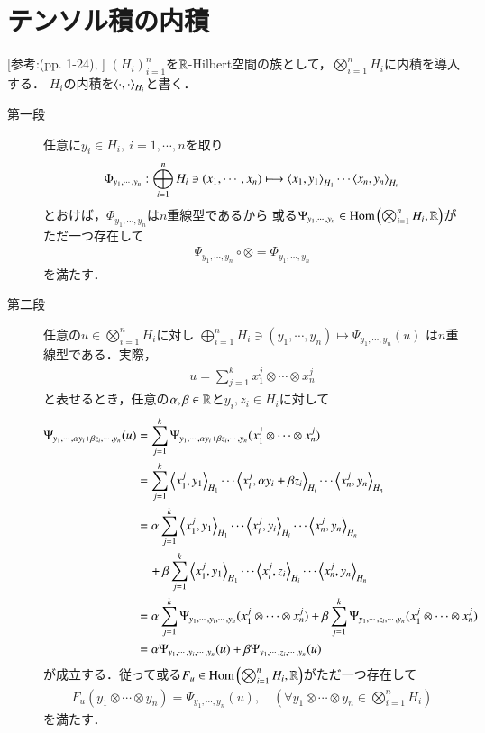 \section{テンソル積の内積}
	[参考:\cite{key8}(pp. 1-24), \cite{key7}] 
	$(H_i)_{i=1}^n$を$\mathbb{R}$-Hilbert空間の族として，$\bigotimes_{i=1}^n H_i$に内積を導入する．
	$H_i$の内積を$\inprod<\cdot,\cdot>_{H_i}$と書く．
	\begin{description}
		\item[第一段] 
			任意に$y_i \in H_i,\ i=1,\cdots,n$を取り
			\begin{align}
				\Phi_{y_1,\cdots,y_n}:
				\bigoplus_{i=1}^n H_i \ni (x_1,\cdots,x_n)
				\longmapsto \inprod<x_1,y_1>_{H_1} \cdots \inprod<x_n,y_n>_{H_n}
			\end{align}
			とおけば，$\Phi_{y_1,\cdots,y_n}$は$n$重線型であるから
			或る$\Psi_{y_1,\cdots,y_n} \in \mathrm{Hom} \left(\bigotimes_{i=1}^n H_i,\mathbb{R}\right)$がただ一つ存在して
			\begin{align}
				\Psi_{y_1,\cdots,y_n} \circ \otimes = \Phi_{y_1,\cdots,y_n}
			\end{align}
			を満たす．
			
		\item[第二段]
			任意の$u \in \bigotimes_{i=1}^n H_i$に対し
			$\bigoplus_{i=1}^n H_i \ni (y_1,\cdots,y_n) \longmapsto \Psi_{y_1,\cdots,y_n}(u)$
			は$n$重線型である．実際，
			\begin{align}
				u = \sum_{j=1}^k x^j_1 \otimes \cdots \otimes x^j_n
			\end{align}
			と表せるとき，任意の$\alpha,\beta \in \mathbb{R}$と$y_i,z_i \in H_i$に対して
			\begin{align}
				\Psi_{y_1,\cdots,\alpha y_i + \beta z_i,\cdots,y_n}(u)
				&= \sum_{j=1}^k \Psi_{y_1,\cdots,\alpha y_i + \beta z_i,\cdots,y_n}(x^j_1 \otimes \cdots \otimes x^j_n) \\
				&= \sum_{j=1}^k \inprod<x^j_1,y_1>_{H_1} \cdots \inprod<x^j_i,\alpha y_i + \beta z_i>_{H_i} \cdots \inprod<x^j_n,y_n>_{H_n} \\
				&= \alpha \sum_{j=1}^k \inprod<x^j_1,y_1>_{H_1} \cdots \inprod<x^j_i,y_i>_{H_i} \cdots \inprod<x^j_n,y_n>_{H_n} \\
				&\quad + \beta \sum_{j=1}^k \inprod<x^j_1,y_1>_{H_1} \cdots \inprod<x^j_i,z_i>_{H_i} \cdots \inprod<x^j_n,y_n>_{H_n} \\
				&= \alpha \sum_{j=1}^k \Psi_{y_1,\cdots,y_i,\cdots,y_n}(x^j_1 \otimes \cdots \otimes x^j_n)
				+ \beta \sum_{j=1}^k \Psi_{y_1,\cdots,z_i,\cdots,y_n}(x^j_1 \otimes \cdots \otimes x^j_n) \\
				&= \alpha \Psi_{y_1,\cdots,y_i,\cdots,y_n}(u)
				+ \beta \Psi_{y_1,\cdots,z_i,\cdots,y_n}(u)
			\end{align}
			が成立する．従って或る$F_u \in \mathrm{Hom} \left(\bigotimes_{i=1}^n H_i,\mathbb{R}\right)$がただ一つ存在して
			\begin{align}
				F_u(y_1 \otimes \cdots \otimes y_n) = \Psi_{y_1,\cdots,y_n}(u),
				\quad (\forall y_1 \otimes \cdots \otimes y_n \in \bigotimes_{i=1}^n H_i)
			\end{align}
			を満たす．
			

\end{description}
